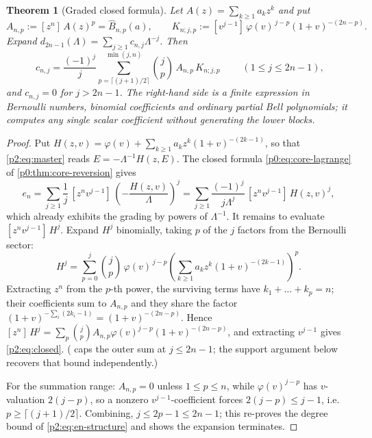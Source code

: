 \documentclass[11pt,a4paper,oneside]{book}
\theoremstyle{plain}
\newtheorem{theorem}{Theorem}[chapter]
\theoremstyle{definition}
\theoremstyle{remark}
\newcommand{\Coef}[1]{[#1]\,}
\newcommand{\OB}{\widehat{B}}
\begin{document}
\begin{theorem}[Graded closed formula]
\label{p2:thm:closed}
Let \(A(z)=\sum_{k\ge1}a_kz^k\) and put
\begin{equation}
 A_{n,p}:=\Coef{z^n}A(z)^p=\OB_{n,p}(a),
 \qquad
 K_{n;j,p}:=\Coef{v^{j-1}}\varphi(v)^{\,j-p}(1+v)^{-(2n-p)} .
 \label{p2:eq:AK}
\end{equation}
Expand \(d_{2n-1}(\Lambda)=\sum_{j\ge1}c_{n,j}\Lambda^{-j}\).  Then
\begin{equation}
 \boxed{\;
 c_{n,j}=\frac{(-1)^j}{j}
 \sum_{p=\lceil (j+1)/2\rceil}^{\min(j,n)}
 \binom jp\,A_{n,p}\,K_{n;j,p}\;}
 \qquad(1\le j\le 2n-1),
 \label{p2:eq:closed}
\end{equation}
and \(c_{n,j}=0\) for \(j>2n-1\).  The right-hand side is a finite expression
in Bernoulli numbers, binomial coefficients and ordinary partial Bell
polynomials; it computes any single scalar coefficient without generating the
lower blocks.
\end{theorem}

\begin{proof}
Put \(H(z,v)=\varphi(v)+\sum_{k\ge1}a_kz^k(1+v)^{-(2k-1)}\), so that
\cref{p2:eq:master} reads \(E=-\Lambda^{-1}H(z,E)\).  The closed formula
\cref{p0:eq:core-lagrange} of \cref{p0:thm:core-reversion} gives
\[
 e_n=\sum_{j\ge1}\frac1j\,\Coef{z^nv^{j-1}}
 \left(-\frac{H(z,v)}\Lambda\right)^{j}
 =\sum_{j\ge1}\frac{(-1)^j}{j\Lambda^j}\,
   \Coef{z^nv^{j-1}}H(z,v)^j ,
\]
which already exhibits the grading by powers of \(\Lambda^{-1}\).  It remains
to evaluate \(\Coef{z^nv^{j-1}}H^j\).  Expand \(H^j\) binomially, taking \(p\) of the \(j\) factors from the
Bernoulli sector:
\[
 H^j=\sum_{p=0}^{j}\binom jp\,\varphi(v)^{\,j-p}
 \left(\sum_{k\ge1}a_kz^k(1+v)^{-(2k-1)}\right)^{p} .
\]
Extracting \(z^n\) from the \(p\)-th power, the surviving terms have
\(k_1+\dots+k_p=n\); their coefficients sum to \(A_{n,p}\) and they share the
factor \((1+v)^{-\sum_i(2k_i-1)}=(1+v)^{-(2n-p)}\).  Hence
\(\Coef{z^n}H^j=\sum_p\binom jpA_{n,p}\varphi(v)^{j-p}(1+v)^{-(2n-p)}\), and
extracting \(v^{j-1}\) gives \cref{p2:eq:closed}.  (
caps the outer sum at \(j\le2n-1\); the support argument below recovers that
bound independently.)

For the summation range: \(A_{n,p}=0\) unless \(1\le p\le n\), while
\(\varphi(v)^{j-p}\) has \(v\)-valuation \(2(j-p)\), so a nonzero
\(v^{j-1}\)-coefficient forces \(2(j-p)\le j-1\), i.e.\
\(p\ge\lceil(j+1)/2\rceil\).  Combining, \(j\le2p-1\le2n-1\); this re-proves
the degree bound of \cref{p2:eq:en-structure} and shows the expansion
terminates.
\end{proof}
\end{document}
